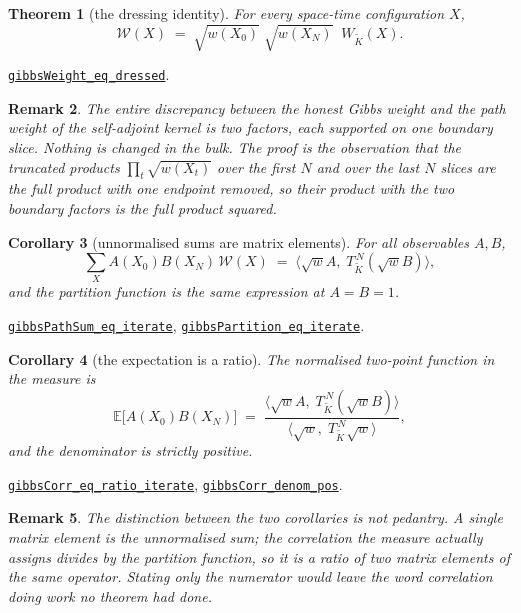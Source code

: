 \documentclass[11pt]{article}
\newtheorem{theorem}{Theorem}[section]
\newtheorem{corollary}[theorem]{Corollary}
\newtheorem{remark}[theorem]{Remark}
\theoremstyle{definition}
\newcommand{\anchor}{c4fa6a9e6769496a7270981ef0908b2d644c230b}
\newcommand{\osline}[3]{%
  \href{https://github.com/lluiseriksson/THE-ERIKSSON-PROGRAMME/blob/\anchor/YangMills/OS/#1.lean\#L#2}{\nolinkurl{#3}}}
\begin{document}
\begin{theorem}[the dressing identity]\label{thm:dress}
For every space-time configuration $X$,
\[
  \mathcal{W}(X)\;=\;\sqrt{w(X_0)}\;\sqrt{w(X_N)}\;\;W_{\widetilde K}(X).
\]
\end{theorem}

\osline{SpatialGibbs}{205}{gibbsWeight\_eq\_dressed}.

\begin{remark}
The entire discrepancy between the honest Gibbs weight and the path weight of
the self-adjoint kernel is two factors, each supported on one boundary slice.
Nothing is changed in the bulk.  The proof is the observation that the
truncated products $\prod_t\sqrt{w(X_t)}$ over the first $N$ and over the last
$N$ slices are the full product with one endpoint removed, so their product
with the two boundary factors is the full product squared.
\end{remark}

\begin{corollary}[unnormalised sums are matrix elements]\label{cor:bridge}
For all observables $A,B$,
\[
  \sum_X A(X_0)B(X_N)\,\mathcal{W}(X)
  \;=\;\bigl\langle \sqrt{w}A,\;T_{\widetilde K}^{\,N}(\sqrt{w}B)\bigr\rangle,
\]
and the partition function is the same expression at $A=B=1$.
\end{corollary}

\osline{SpatialGibbs}{253}{gibbsPathSum\_eq\_iterate},
\osline{SpatialGibbs}{262}{gibbsPartition\_eq\_iterate}.

\begin{corollary}[the expectation is a ratio]\label{cor:ratio}
The normalised two-point function in the measure is
\[
  \mathbb{E}\bigl[A(X_0)B(X_N)\bigr]
  \;=\;
  \frac{\bigl\langle \sqrt{w}A,\;T_{\widetilde K}^{\,N}(\sqrt{w}B)\bigr\rangle}
       {\bigl\langle \sqrt{w},\;T_{\widetilde K}^{\,N}\sqrt{w}\bigr\rangle},
\]
and the denominator is strictly positive.
\end{corollary}

\osline{SpatialGibbs}{277}{gibbsCorr\_eq\_ratio\_iterate},
\osline{SpatialGibbs}{288}{gibbsCorr\_denom\_pos}.

\begin{remark}
The distinction between the two corollaries is not pedantry.  A single matrix
element is the \emph{unnormalised} sum; the correlation the measure actually
assigns divides by the partition function, so it is a ratio of two matrix
elements of the same operator.  Stating only the numerator would leave the
word \emph{correlation} doing work no theorem had done.
\end{remark}
\end{document}

